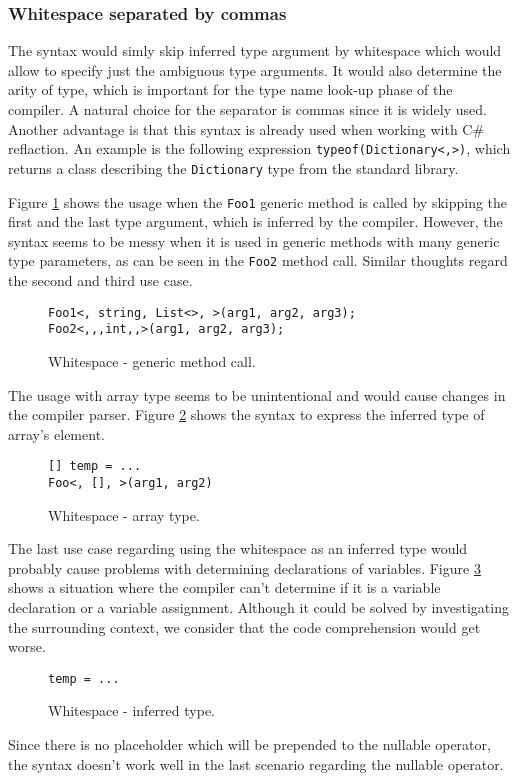 \subsubsection{Whitespace separated by commas} 

The syntax would simly skip inferred type argument by whitespace which would allow to specify just the ambiguous type arguments. 
It would also determine the arity of type, which is important for the type name look-up phase of the compiler. 
A natural choice for the separator is commas since it is widely used. 
Another advantage is that this syntax is already used when working with C\# reflaction. 
An example is the following expression \texttt{typeof(Dictionary<,>)}, which returns a class describing the \texttt{Dictionary} type from the standard library.
\par
Figure \ref{img45:opW1} shows the usage when the \texttt{Foo1} generic method is called by
skipping the first and the last type argument, which is inferred by the compiler. 
However, the syntax seems to be messy when it is used in generic methods with many generic type parameters, as can be seen in the \texttt{Foo2} method call. 
Similar thoughts regard the second and third use case.
\begin{figure}[h]
\begin{lstlisting}[style=csharp]
Foo1<, string, List<>, >(arg1, arg2, arg3);
Foo2<,,,int,,>(arg1, arg2, arg3);
\end{lstlisting}
\caption{Whitespace - generic method call.}
\label{img45:opW1}
\end{figure}
\par
The usage with array type seems to be unintentional and would cause changes in the compiler parser. 
Figure \ref{img46:opW4} shows the syntax to express the inferred type of array's element.
\begin{figure}[h!]
\begin{lstlisting}[style=csharp]
[] temp = ...
Foo<, [], >(arg1, arg2)
\end{lstlisting}
\caption{Whitespace - array type.}
\label{img46:opW4}
\end{figure}
\par
The last use case regarding using the whitespace as an inferred type would probably cause problems with determining declarations of variables. 
Figure \ref{img47:opW5} shows a situation where the compiler can’t determine if it is a variable declaration or a variable assignment. 
Although it could be solved by investigating the surrounding context, we consider that the code comprehension would get worse.
\begin{figure}[h]
\begin{lstlisting}[style=csharp]
temp = ...
\end{lstlisting}
\caption{Whitespace - inferred type.}
\label{img47:opW5}
\end{figure}
\par
Since there is no placeholder which will be prepended to the nullable operator, the syntax doesn't work well in the last scenario regarding the nullable operator.


